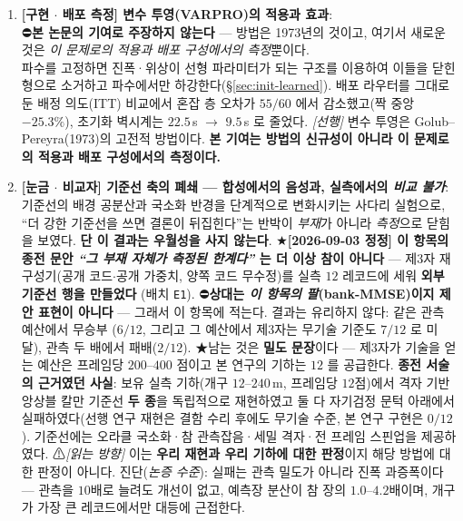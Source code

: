 \documentclass[11pt]{report}
\numberwithin{equation}{chapter}
\numberwithin{figure}{chapter}
\numberwithin{table}{chapter}
\begin{document}
\begin{enumerate}
  \item \textbf{[구현 $\cdot$ 배포 측정] 변수 투영(VARPRO)의 적용과 효과}: \\
        ⛔\textbf{본 논문의 기여로 주장하지 않는다} --- 방법은 1973년의 것이고,
        여기서 새로운 것은 \emph{이 문제로의 적용과 배포 구성에서의 측정}뿐이다. \\
        파수를 고정하면 진폭·위상이 선형 파라미터가 되는 구조를 이용하여 이들을
        닫힌형으로 소거하고 파수에서만 하강한다(\S\ref{sec:init-learned}).
        배포 라우터를 그대로 둔 배정 의도(ITT) 비교에서 혼잡 층 오차가 $55/60$ 에서
        감소했고(짝 중앙 $-25.3\%$), 초기화 벽시계는 $22.5$\,s $\to$ $9.5$\,s 로 줄었다.
        \emph{[선행]} 변수 투영은 Golub--Pereyra(1973)의 고전적 방법이다.
        \textbf{본 기여는 방법의 신규성이 아니라 이 문제로의 적용과 배포 구성에서의 측정이다.}

  \item \textbf{[눈금 $\cdot$ 비교자] 기준선 축의 폐쇄 --- 합성에서의 음성과, 실측에서의 \emph{비교 불가}}: \\
        기준선의 배경 공분산과 국소화 반경을 단계적으로 변화시키는 사다리 실험으로,
        ``더 강한 기준선을 쓰면 결론이 뒤집힌다''는 반박이 \emph{부재}가 아니라
        \emph{측정}으로 닫힘을 보였다. \textbf{단 이 결과는 우월성을 사지 않는다}.
        ★\textbf{[2026-09-03 정정] 이 항목의 종전 문안 \emph{``그 부재 자체가 측정된
        한계다''} 는 더 이상 참이 아니다} --- 제3자 재구성기(공개 코드$\cdot$공개 가중치,
        양쪽 코드 무수정)를 실측 $12$ 레코드에 세워 \textbf{외부 기준선 행을 만들었다}
        (배치 \texttt{E1}). ⛔\textbf{상대는 \emph{이 항목의 팔}(bank-MMSE)이지 제안
        표현이 아니다} --- 그래서 이 항목에 적는다. 결과는 유리하지 않다: 같은 관측 예산에서 무승부
        ($6/12$, 그리고 그 예산에서 제3자는 무기술 기준도 $7/12$ 로 미달), 관측 두 배에서
        패배($2/12$). ★남는 것은 \textbf{밀도 문장}이다 --- 제3자가 기술을 얻는 예산은
        프레임당 $200$--$400$ 점이고 본 연구의 기하는 $12$ 를 공급한다.
        \textbf{종전 서술의 근거였던 사실}: 보유 실측 기하(개구 $12$--$240$\,m,
        프레임당 $12$점)에서 격자 기반
        앙상블 칼만 기준선 \textbf{두 종}을 독립적으로 재현하였고 둘 다 자기검정 문턱 아래에서
        실패하였다(선행 연구 재현은 결함 수리 후에도 무기술 수준, 본 연구 구현은 $0/12$).
        기준선에는 오라클 국소화·참 관측잡음·세밀 격자·전 프레임 스핀업을 제공하였다.
        ⚠\emph{[읽는 방향]} 이는 \textbf{우리 재현과 우리 기하에 대한 판정}이지 해당 방법에
        대한 판정이 아니다. 진단(\emph{논증 수준}): 실패는 관측 밀도가 아니라 진폭 과증폭이다
        --- 관측을 $10$배로 늘려도 개선이 없고, 예측장 분산이 참 장의 $1.0$--$4.2$배이며,
        개구가 가장 큰 레코드에서만 대등에 근접한다.


\end{enumerate}
\end{document}
